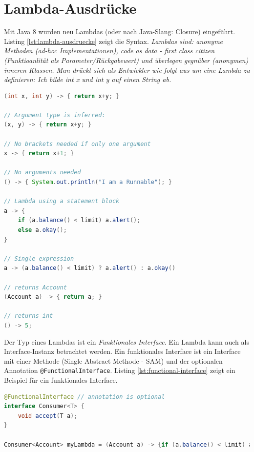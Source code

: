 \section{Lambda-Ausdrücke}

Mit Java 8 wurden neu Lambdas (oder nach Java-Slang: Closure) eingeführt. Listing \ref{lst:lambda-ausdruecke} zeigt die Syntax. \textit{Lambdas sind: anonyme Methoden (ad-hoc Implementationen), code as data - first class citizen (Funktioanlität als Parameter/Rückgabewert) und überlegen gegnüber (anonymen) inneren Klassen. Man drückt sich als Entwickler wie folgt aus um eine Lambda zu definieren: Ich bilde int x und int y auf einen String ab.}

\begin{lstlisting}[language=Java, caption=Lambda-Ausdrücke, label=lst:lambda-ausdruecke]
(int x, int y) -> { return x+y; }

// Argument type is inferred:
(x, y) -> { return x+y; }

// No brackets needed if only one argument
x -> { return x+1; }

// No arguments needed
() -> { System.out.println("I am a Runnable"); }

// Lambda using a statement block
a -> {
	if (a.balance() < limit) a.alert();
	else a.okay();
}

// Single expression
a -> (a.balance() < limit) ? a.alert() : a.okay()

// returns Account
(Account a) -> { return a; }

// returns int
() -> 5;
\end{lstlisting}

Der Typ eines Lambdas ist ein \textit{Funktionales Interface}. Ein Lambda kann auch als Interface-Instanz betrachtet werden. Ein funktionales Interface ist ein Interface mit einer Methode (Single Abstract Methode - SAM) und der optionalen Annotation \verb|@FunctionalInterface|. Listing \ref{lst:functional-interface} zeigt ein Beispiel für ein funktionales Interface.

\begin{lstlisting}[language=Java, caption=functional interface (SAM), label=lst:functional-interface]
@FunctionalInterface // annotation is optional
interface Consumer<T> {
	void accept(T a);
}

Consumer<Account> myLambda = (Account a) -> {if (a.balance() < limit) a.alert(); };
\end{lstlisting}

